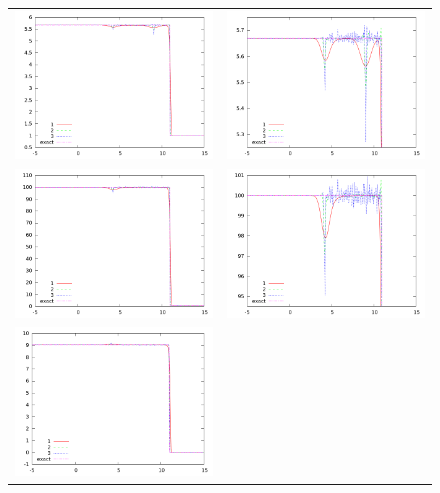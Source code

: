 \documentclass[10pt,preprint]{aastex}
\begin{document}
\begin{figure}[h]
  \begin{center}
	\begin{tabular}{cc}
      \includegraphics[width=.4\textwidth]{den_T10.png} &
	  \includegraphics[width=.4\textwidth]{den10zoom.png} \\
	  \includegraphics[width=.4\textwidth]{prs_T10.png} &	
	  \includegraphics[width=.4\textwidth]{prs10zoom.png} \\
      \includegraphics[width=.4\textwidth]{vel_T10.png} &	

\end{tabular}
\end{center}
\end{figure}
\end{document}
